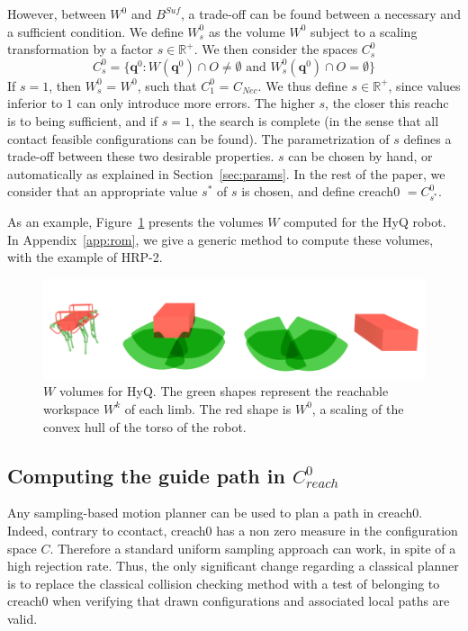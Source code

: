 However, between $W^0$ and $B^{Suf}$, a trade-off can be found between a necessary and a sufficient condition. We define $W^0_s$ as the volume $W^0$ subject to a scaling transformation by a factor $s \in \mathbb{R}^+$.
%
We then consider the spaces $C_{s}^0$
 \begin{equation}
C^0_s = \{ \mathbf{q}^0 : W(\mathbf{q}^{0}) \cap O \neq \emptyset \text{ and } W^0_s(\mathbf{q}^{0}) \cap O = \emptyset \} %
\end{equation}
%
If $s=1$, then $W^0_s$ = $W^0$, such that $C_1^0$ = $C_{Nec}$. We thus define $s \in \mathbb{R}^+$, since values inferior to $1$ can only introduce more errors.
The higher $s$, the closer this \gls{reachc} is to being sufficient, and if $s=1$, the search is complete (in the sense that all \gls{contact feasible} configurations can be found). The parametrization of $s$ defines a trade-off between these two desirable properties. $s$ can be chosen by hand, or automatically as explained in Section~\ref{sec:params}.
In the rest of the paper, we consider that an appropriate value $s^*$ of $s$ is chosen, and define \gls{creach0} $= C^0_{s^*}$.

As an example, Figure~\ref{fig:HyQ_roms} presents the volumes $W$ computed for the HyQ robot.
In Appendix~\ref{app:rom}, we give a generic method to compute these volumes, with the example of HRP-2.

\begin{figure}
  \centering
  \includegraphics[width=0.95\linewidth]{figures/HyQ_roms}
  \caption{
           $W$ volumes for HyQ. The green shapes represent the reachable workspace $W^k$ of each limb. The red shape is $W^0$, a scaling of the convex hull
           of the torso of the robot.}
		   \label{fig:HyQ_roms}
\end{figure}

\subsection{Computing the guide path in $C_{reach}^0$}
Any sampling-based motion planner can be used to plan a path in \gls{creach0}. 
Indeed, contrary to \gls{ccontact}, \gls{creach0} has a non zero measure in the configuration space $C$. Therefore a standard uniform sampling approach
can work, in spite of a high rejection rate. 
Thus, the only significant change regarding a classical planner is to replace the classical collision checking method with a test of belonging to \gls{creach0} when verifying
that drawn configurations and associated local paths are valid.

